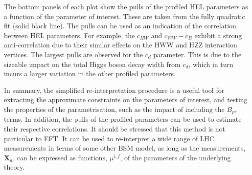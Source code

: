 The bottom panels of each plot show the pulls of the profiled HEL parameters as a function of the parameter of interest. These are taken from the fully quadratic fit (solid black line). The pulls can be used as an indication of the correlation between HEL parameters. For example, the $c_{HW}$ and $c_{WW}-c_B$ exhibit a strong anti-correlation due to their similar effects on the HWW and HZZ interaction vertices. The largest pulls are observed for the $c_d$ parameter. This is due to the sizeable impact on the total Higgs boson decay width from $c_d$, which in turn incurs a larger variation in the other profiled parameters.

In summary, the simplified re-interpretation procedure is a useful tool for extracting the approximate constraints on the parameters of interest, and testing the properties of the parametrisation, such as the impact of including the $B_{pr}$ terms. In addition, the pulls of the profiled parameters can be used to estimate their respective correlations. It should be stressed that this method is not particular to EFT. It can be used to re-interpret a wide range of LHC measurements in terms of some other BSM model, as long as the measurements, $\mathbf{X}_a$, can be expressed as functions, $\mu^{i,f}$, of the parameters of the underlying theory.

